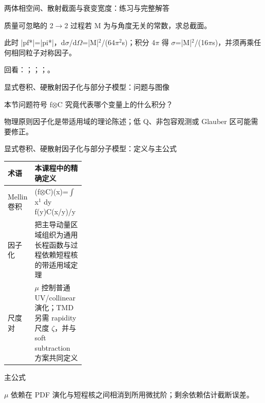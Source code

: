 \begin{frame}[t]{两体相空间、散射截面与衰变宽度：练习与完整解答}
\footnotesize
\begin{block}{}质量可忽略的 2\ensuremath{\rightarrow}2 过程若 M 为与角度无关的常数，求总截面。\end{block}
\begin{exampleblock}{}此时 |pf*|=|pi*|，d\ensuremath{\sigma}/\allowbreak{}d\ensuremath{\Omega}=|M|\ensuremath{^{2}}/\allowbreak{}(64\ensuremath{\pi}\ensuremath{^{2}}s)；积分 4\ensuremath{\pi} 得 \ensuremath{\sigma}=|M|\ensuremath{^{2}}/\allowbreak{}(16\ensuremath{\pi}s)，并须再乘任何相同粒子对称因子。\end{exampleblock}
\vfill
\scriptsize 回看：；；；。
\end{frame}

\begin{frame}[t]{显式卷积、硬散射因子化与部分子模型：问题与图像}
\footnotesize
\begin{block}{本节问题}符号 f\ensuremath{\otimes}C 究竟代表哪个变量上的什么积分？\end{block}
\begin{block}{物理原则}\quad 因子化是带适用域的理论陈述；低 Q、非包容观测或 Glauber 区可能需要修正。\end{block}
\end{frame}

\begin{frame}[t]{显式卷积、硬散射因子化与部分子模型：定义与主公式}
\footnotesize\begin{tabularx}{\linewidth}{p{0.30\linewidth}Y}
\toprule 术语 & 本课程中的精确定义\\\midrule
{} Mellin 卷积 & (f\ensuremath{\otimes}C)(x)=\ensuremath{\int}x\ensuremath{^{1}} dy f(y)C(x/\allowbreak{}y)/\allowbreak{}y\\
 因子化 & 把主导动量区域组织为通用长程函数与过程依赖短程核的带适用域定理\\
 尺度对 & \ensuremath{\mu} 控制普通 UV/\allowbreak{}collinear 演化；TMD 另需 rapidity 尺度 \ensuremath{\zeta}，并与 soft subtraction 方案共同定义\\
\bottomrule\end{tabularx}\vspace{0.15cm}
\begin{block}{ 主公式}\centering{}\end{block}
\ensuremath{\mu} 依赖在 PDF 演化与短程核之间相消到所用微扰阶；剩余依赖估计截断误差。
\end{frame}

